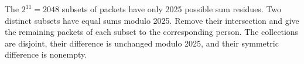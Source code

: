 The $2^{11}=2048$ subsets of packets have only 2025 possible sum residues. Two distinct subsets have equal sums modulo 2025. Remove their intersection and give the remaining packets of each subset to the corresponding person. The collections are disjoint, their difference is unchanged modulo 2025, and their symmetric difference is nonempty.
